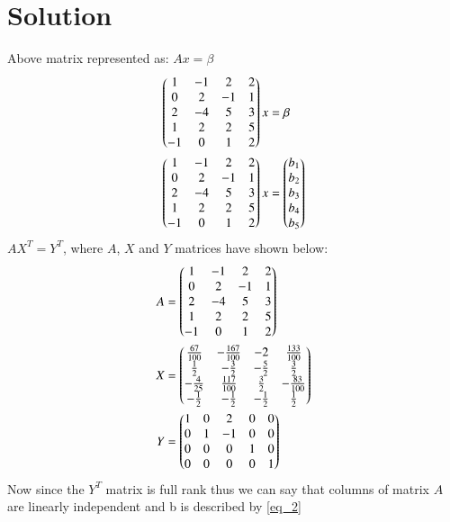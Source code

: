 \documentclass[journal,12pt,twocolumn]{IEEEtran}
\begin{document}
\section{\textbf{Solution}}
Above matrix represented as: $Ax = \beta$
\begin{align}
    \begin{pmatrix}1 & -1 & 2 & 2 \\
                    0 & 2 & -1 & 1 \\
                    2 & -4 & 5 & 3 \\
                    1 & 2 & 2 & 5 \\
                    -1 & 0 & 1 & 2\end{pmatrix}x &= \beta\\
    \begin{pmatrix}1 & -1 & 2 & 2 \\
                    0 & 2 & -1 & 1 \\
                    2 & -4 & 5 & 3 \\
                    1 & 2 & 2 & 5 \\
                    -1 & 0 & 1 & 2\end{pmatrix}x &= 
                    \begin{pmatrix}b_1 \\ b_2 \\ b_3\\ b_4 \\ b_5\end{pmatrix} \label{eq_2}
\end{align}
$AX^T = Y^T$, where $A$, $X$ and $Y$ matrices have shown below:
\begin{align}
    A &= \begin{pmatrix}1 & -1 & 2 & 2 \\
                    0 & 2 & -1 & 1 \\
                    2 & -4 & 5 & 3 \\
                    1 & 2 & 2 & 5 \\
                    -1 & 0 & 1 & 2\end{pmatrix} \\
    X &= \begin{pmatrix}\frac{67}{100}&-\frac{167}{100}&-2&\frac{133}{100}\\
           \frac{1}{2}&-\frac{3}{2}&-\frac{5}{2}&\frac{3}{2}\\
           -\frac{4}{25}&\frac{117}{100}&\frac{3}{2}&-\frac{83}{100}\\
           -\frac{1}{2}&-\frac{1}{2}&-\frac{1}{2}&\frac{1}{2}\end{pmatrix} \\
   Y &= \begin{pmatrix}1 & 0 & 2 & 0 & 0 \\
           0 & 1 & -1 & 0 & 0 \\
           0 & 0 & 0 & 1 & 0 \\
           0 & 0 & 0 & 0 & 1\end{pmatrix}
\end{align}
Now since the $Y^T$ matrix is full rank thus we can say that columns of matrix $A$ are linearly independent and b is described by \eqref{eq_2}
\end{document}
